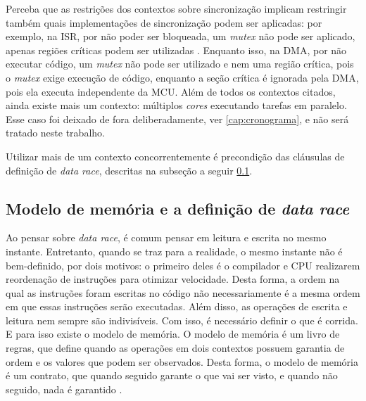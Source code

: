 Perceba que as restrições dos contextos sobre sincronização implicam restringir também quais implementações de sincronização podem ser aplicadas: por exemplo, na \ac{ISR}, por não poder ser bloqueada, um \textit{mutex} não pode ser aplicado, apenas regiões críticas podem ser utilizadas \citep{eriksson2013rtfm}. Enquanto isso, na \ac{DMA}, por não executar código, um \textit{mutex} não pode ser utilizado e nem uma região crítica, pois o \textit{mutex} exige execução de código, enquanto a seção crítica é ignorada pela \ac{DMA}, pois ela executa independente da \ac{MCU}. Além de todos os contextos citados, ainda existe mais um contexto: múltiplos \textit{cores} executando tarefas em paralelo. Esse caso foi deixado de fora deliberadamente, ver \ref{cap:cronograma}, e não será tratado neste trabalho.

Utilizar mais de um contexto concorrentemente é precondição das cláusulas de definição de \textit{data race}, descritas na subseção a seguir \ref{subsec:dr-def}.

\subsection{Modelo de memória e a definição de \textit{data race}}
\label{subsec:dr-def}

Ao pensar sobre \textit{data race}, é comum pensar em leitura e escrita no mesmo instante. Entretanto, quando se traz para a realidade, o mesmo instante não é bem-definido, por dois motivos: o primeiro deles é o compilador e \ac{CPU} realizarem reordenação de instruções para otimizar velocidade. Desta forma, a ordem na qual as instruções foram escritas no código não necessariamente é a mesma ordem em que essas instruções serão executadas. Além disso, as operações de escrita e leitura nem sempre são indivisíveis. Com isso, é necessário definir o que é corrida. E para isso existe o modelo de memória. O modelo de memória é um livro de regras, que define quando as operações em dois contextos possuem garantia de ordem e os valores que podem ser observados. Desta forma, o modelo de memória é um contrato, que quando seguido garante o que vai ser visto, e quando não seguido, nada é garantido \citep{boehm2008foundations,adve2010memory}.

